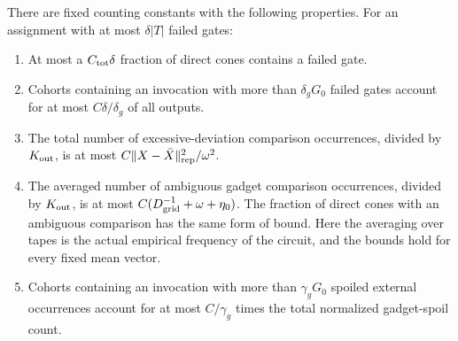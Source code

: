\begin{lemma}
\label{out:charges}
There are fixed counting constants with the following properties.
For an assignment with at most $\delta|T|$ failed gates:
\begin{enumerate}[label=\textup{(\roman*)}]
\item At most a $C_{\rm tot}\delta$ fraction of direct cones contains a
failed gate.
\item Cohorts containing an invocation with more than $\delta_gG_0$
failed gates account for at most $C\delta/\delta_g$ of all outputs.
\item The total number of excessive-deviation comparison occurrences,
divided by $K_{\rm out}$, is at most
$C\lVert X-\bar X\rVert_{\rm rep}^2/\omega^2$.
\item The averaged number of ambiguous gadget comparison occurrences,
divided by $K_{\rm out}$, is at most
$C(D_{\rm grid}^{-1}+\omega+\eta_0)$.
The fraction of direct cones with an ambiguous comparison has the same
form of bound. Here the averaging over tapes is the actual empirical
frequency of the circuit, and the bounds hold for every fixed mean
vector.
\item Cohorts containing an invocation with more than $\gamma_gG_0$
spoiled external occurrences account for at most $C/\gamma_g$ times
the total normalized gadget-spoil count.
\end{enumerate}
\end{lemma}
